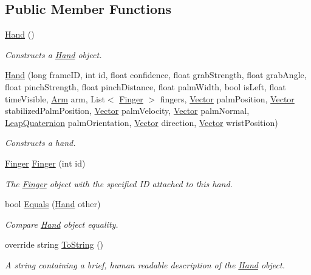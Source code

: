 \subsection*{Public Member Functions}
\begin{DoxyCompactItemize}
\item 
\mbox{\hyperlink{class_leap_1_1_hand_a80199f766e3002861153afefa3d19650}{Hand}} ()
\begin{DoxyCompactList}\small\item\em Constructs a \mbox{\hyperlink{class_leap_1_1_hand}{Hand}} object. \end{DoxyCompactList}\item 
\mbox{\hyperlink{class_leap_1_1_hand_a22d968c711ec019c96b5626a174f470e}{Hand}} (long frame\+ID, int id, float confidence, float grab\+Strength, float grab\+Angle, float pinch\+Strength, float pinch\+Distance, float palm\+Width, bool is\+Left, float time\+Visible, \mbox{\hyperlink{class_leap_1_1_arm}{Arm}} arm, List$<$ \mbox{\hyperlink{class_leap_1_1_finger}{Finger}} $>$ fingers, \mbox{\hyperlink{struct_leap_1_1_vector}{Vector}} palm\+Position, \mbox{\hyperlink{struct_leap_1_1_vector}{Vector}} stabilized\+Palm\+Position, \mbox{\hyperlink{struct_leap_1_1_vector}{Vector}} palm\+Velocity, \mbox{\hyperlink{struct_leap_1_1_vector}{Vector}} palm\+Normal, \mbox{\hyperlink{struct_leap_1_1_leap_quaternion}{Leap\+Quaternion}} palm\+Orientation, \mbox{\hyperlink{struct_leap_1_1_vector}{Vector}} direction, \mbox{\hyperlink{struct_leap_1_1_vector}{Vector}} wrist\+Position)
\begin{DoxyCompactList}\small\item\em Constructs a hand. \end{DoxyCompactList}\item 
\mbox{\hyperlink{class_leap_1_1_finger}{Finger}} \mbox{\hyperlink{class_leap_1_1_hand_a34ce0ba3c66bc5a83dabbd10341da536}{Finger}} (int id)
\begin{DoxyCompactList}\small\item\em The \mbox{\hyperlink{class_leap_1_1_finger}{Finger}} object with the specified ID attached to this hand. \end{DoxyCompactList}\item 
bool \mbox{\hyperlink{class_leap_1_1_hand_aeebe260489e221f30611d12e850200f4}{Equals}} (\mbox{\hyperlink{class_leap_1_1_hand}{Hand}} other)
\begin{DoxyCompactList}\small\item\em Compare \mbox{\hyperlink{class_leap_1_1_hand}{Hand}} object equality. \end{DoxyCompactList}\item 
override string \mbox{\hyperlink{class_leap_1_1_hand_a10288a6a0fc042cd21cd21ff9a80b58f}{To\+String}} ()
\begin{DoxyCompactList}\small\item\em A string containing a brief, human readable description of the \mbox{\hyperlink{class_leap_1_1_hand}{Hand}} object. \end{DoxyCompactList}\end{DoxyCompactItemize}
